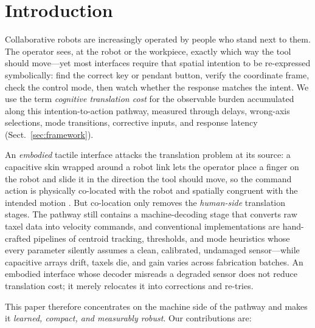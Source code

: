 \documentclass[runningheads]{llncs}
\begin{document}
\section{Introduction}
\label{sec:intro}

Collaborative robots are increasingly operated by people who stand next
to them. The operator sees, at the robot or the workpiece, exactly which
way the tool should move---yet most interfaces require that spatial
intention to be re-expressed symbolically: find the correct key or
pendant button, verify the coordinate frame, check the control mode,
then watch whether the response matches the intent. We use the term
\emph{cognitive translation cost} for the observable burden accumulated
along this intention-to-action pathway, measured through delays,
wrong-axis selections, mode transitions, corrective inputs, and response
latency (Sect.~\ref{sec:framework}).

An \emph{embodied} tactile interface attacks the translation problem at
its source: a capacitive skin wrapped around a robot link lets the
operator place a finger on the robot and slide it in the direction the
tool should move, so the command action is physically co-located with
the robot and spatially congruent with the intended motion
\cite{fitts1953}. But co-location only removes the \emph{human-side}
translation stages. The pathway still contains a machine-decoding stage
that converts raw taxel data into velocity commands, and conventional
implementations are hand-crafted pipelines of centroid tracking,
thresholds, and mode heuristics whose every parameter silently assumes a
clean, calibrated, undamaged sensor---while capacitive arrays drift,
taxels die, and gain varies across fabrication batches. An embodied
interface whose decoder misreads a degraded sensor does not reduce
translation cost; it merely relocates it into corrections and re-tries.

This paper therefore concentrates on the machine side of the pathway and
makes it \emph{learned, compact, and measurably robust}. Our
contributions are:
\end{document}
